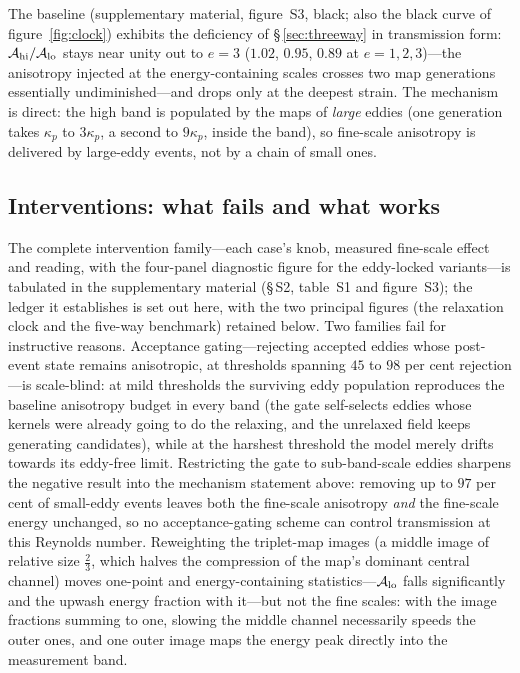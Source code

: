 \documentclass[lineno]{JFM-FLM_Au}
\begin{document}
The baseline (supplementary material, figure~S3, black; also the black
curve of figure~\ref{fig:clock}) exhibits the deficiency of
\S\,\ref{sec:threeway} in transmission form:
$\mathcal A_{\rm hi}/\mathcal A_{\rm lo}$ stays near unity out to $e=3$
($1.02$, $0.95$, $0.89$ at $e=1,2,3$)---the anisotropy injected at the
energy-containing scales crosses two map generations essentially
undiminished---and drops only at the deepest strain. The mechanism is
direct: the high band is populated by the maps of \emph{large} eddies
(one generation takes $\kappa_p$ to $3\kappa_p$, a second to $9\kappa_p$,
inside the band), so fine-scale anisotropy is delivered by large-eddy
events, not by a chain of small ones.

\subsection{Interventions: what fails and what works}\label{sec:interventions}

The complete intervention family---each case's knob, measured
fine-scale effect and reading, with the four-panel diagnostic figure
for the eddy-locked variants---is tabulated in the supplementary
material (\S\,S2, table~S1 and figure~S3); the ledger it establishes
is set out here, with the two principal figures (the relaxation clock
and the five-way benchmark) retained below. Two
families fail for instructive reasons. Acceptance gating---rejecting
accepted eddies whose post-event state remains anisotropic, at thresholds
spanning $45$ to $98$ per cent rejection---is scale-blind: at mild
thresholds the surviving eddy population reproduces the baseline
anisotropy budget in every band (the gate self-selects eddies whose
kernels were already going to do the relaxing, and the unrelaxed field
keeps generating candidates), while at the harshest threshold the model
merely drifts towards its eddy-free limit. Restricting the gate to
sub-band-scale eddies sharpens the negative result into the mechanism
statement above: removing up to $97$ per cent of small-eddy events leaves
both the fine-scale anisotropy \emph{and} the fine-scale energy
unchanged, so no acceptance-gating scheme can control transmission at
this Reynolds number. Reweighting the triplet-map images (a middle image
of relative size $\tfrac23$, which halves the compression of the
map's dominant central channel) moves one-point and energy-containing
statistics---$\mathcal A_{\rm lo}$ falls significantly and the upwash
energy fraction with it---but not the fine scales: with the image
fractions summing to one, slowing the middle channel necessarily speeds
the outer ones, and one outer image maps the energy peak directly into
the measurement band.
\end{document}
